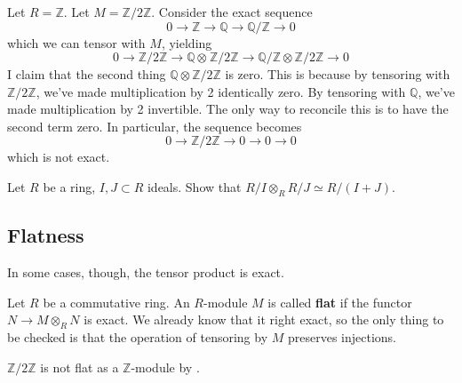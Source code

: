 \begin{example} \label{tensorbad}
Let $R = \mathbb{Z}$. Let $M = \mathbb{Z}/2\mathbb{Z}$. Consider the exact
sequence
\[ 0 \to \mathbb{Z} \to \mathbb{Q} \to \mathbb{Q}/\mathbb{Z} \to 0  \]
which we can tensor with $M$, yielding
\[ 0 \to \mathbb{Z}/2\mathbb{Z} \to \mathbb{Q} \otimes_{}
\mathbb{Z}/2\mathbb{Z} \to  \mathbb{Q}/\mathbb{Z} \otimes
\mathbb{Z}/2\mathbb{Z} \to 0  \]
I claim that the second thing $\mathbb{Q} \otimes \mathbb{Z}/2\mathbb{Z}$
is zero.  This is because by tensoring with
$\mathbb{Z}/2\mathbb{Z}$, we've made multiplication by 2 identically zero. By
tensoring with $\mathbb{Q}$, we've made multiplication by 2 invertible. The
only way to reconcile this is to have the second term zero. In particular, the
sequence becomes
\[ 0 \to \mathbb{Z}/2\mathbb{Z} \to 0 \to 0 \to 0  \]
which is not exact.
\end{example}

\begin{exercise}
Let $R$ be a ring, $I, J \subset R$ ideals. Show that $R/I \otimes_R R/J
\simeq R/(I+J)$.
\end{exercise}
\subsection{Flatness}
In some cases, though, the tensor product is exact.

\begin{definition}
Let $R$ be a commutative ring. An $R$-module $M$ is called \textbf{flat} if the
functor $N \to M \otimes_R N$ is exact. We already know that it right exact,
so the only thing to be checked is that the operation of  tensoring by $M$
preserves injections.
\end{definition}

\begin{example}
$\mathbb{Z}/2\mathbb{Z}$ is not flat as a $\mathbb{Z}$-module by
.

\end{example}

